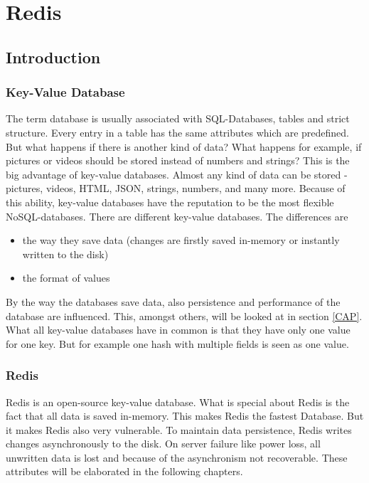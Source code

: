 \chapter {Redis}
\section {Introduction}
\subsection {Key-Value Database}
The term \grqq database\grqq{ } is usually associated with SQL-Databases, tables and strict structure. Every entry in a table has the same attributes which are predefined.
But what happens if there is another kind of data? What happens for example, if pictures or videos should be stored instead of numbers and strings?
This is the big advantage of key-value databases. Almost any kind of data can be stored - pictures, videos, HTML, JSON, strings, numbers, and many more. Because of this ability, key-value databases have the reputation to be the most flexible NoSQL-databases.
There are different key-value databases. The differences are
\begin{itemize}
	\item the way they save data (changes are firstly saved in-memory or instantly written to the disk)
	\item the format of values
\end{itemize}
By the way the databases save data, also persistence and performance of the database are influenced. This, amongst others, will be looked at in section \ref{CAP}. %
What all key-value databases have in common is that they have only one value for one key. But for example one hash with multiple fields is seen as one value.\cite{KV}
\subsection {Redis}
Redis is an open-source key-value database.
What is special about Redis is the fact that all data is saved in-memory. This makes Redis the fastest Database. But it makes Redis also very vulnerable. To maintain data persistence, Redis writes changes asynchronously to the disk. On server failure like power loss, all unwritten data is lost and because of the asynchronism not recoverable.\cite{Seeger}
These attributes will be elaborated in the following chapters.